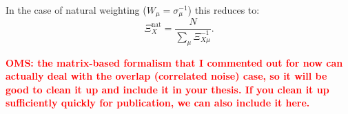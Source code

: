 \documentclass[useAMS,usenatbib]{mn2e}
\newcommand{\OMS}[1]{\textcolor{red}{{\bf OMS: #1}}}
\begin{document}
In the case of natural weighting ($W_\mu=\sigma_\mu^{-1}$) this reduces to:
\begin{equation}
\Xi_X^{\mathrm{nat}} = \frac{N}{ \sum_{\mu} \Xi_{X\mu}^{-1} }.
\end{equation}

\OMS{the matrix-based formalism that I commented out for now can actually deal with the overlap (correlated noise) 
case, so it will be good to clean it up and include it in your thesis. If you clean it up sufficiently quickly for
publication, we can also include it here.}

\end{document}
